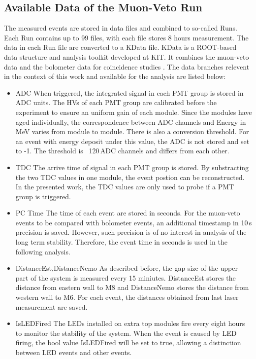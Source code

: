 \subsection{Available Data of the Muon-Veto Run}

The measured events are stored in data files and combined to so-called Runs. Each Run contains up to 99 files, with each file stores 8 hours measurement. The data in each Run file are converted to a KData file. KData is a ROOT-based \cite{Bru97} data structure and analysis toolkit developed at KIT. It combines the muon-veto data and the bolometer data for coincidence studies \cite{Cox12}.
The data branches relevent in the context of this work and available for the analysis are listed below:
\begin{itemize}
  \item ADC
  When triggered, the integrated signal in each PMT group is stored in ADC units. The HVs of each PMT group are calibrated before the experiment to ensure an uniform gain of each module. Since the modules have aged individually, the correspondence between ADC channels and Energy in MeV varies from module to module. There is also a conversion threshold. For an event with energy deposit under this value, the ADC is not stored and set to -1. The threshold is ~120\,ADC channels and differs from each other.

  \item TDC
  The arrive time of signal in each PMT group is stored. By substracting the two TDC values in one module, the event postion can be reconstructed. In the presented work, the TDC values are only used to probe if a PMT group is triggered.


  \item{PC Time}
  The time of each event are stored in seconds. For the muon-veto events to be compared with bolometer events, an additional timestamp in 10\,\upmu{}s precision is saved. However, such precision is of no interest in analysis of the long term stability. Therefore, the event time in seconds is used in the following analysis.

  \item{DistanceEst,DistanceNemo}
  As described before, the gap size of the upper part of the system is measured every 15 miniutes. DistanceEst stores the distance from eastern wall to M8 and DistanceNemo stores the distance from western wall to M6. For each event, the distances obtained from last laser measurement are saved.

  \item{IsLEDFired}
  The LEDs installed on extra top modules fire every eight hours to monitor the stability of the system. When the event is caused by LED firing, the bool value IsLEDFired will be set to true, allowing a distinction between LED events and other events.
\end{itemize}






